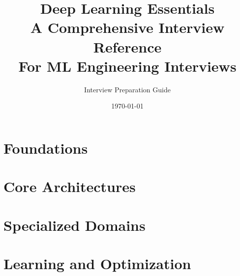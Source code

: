 \documentclass[11pt,twoside]{book}
\title{
    \Huge\textbf{Deep Learning Essentials}\\[0.5cm]
    \Large A Comprehensive Interview Reference\\[0.3cm]
    \large For ML Engineering Interviews
}
\author{Interview Preparation Guide}
\date{\today}
\begin{document}
\frontmatter
\maketitle
\tableofcontents




\mainmatter

\part{Foundations}






\part{Core Architectures}









\part{Specialized Domains}





\part{Learning and Optimization}
\end{document}
